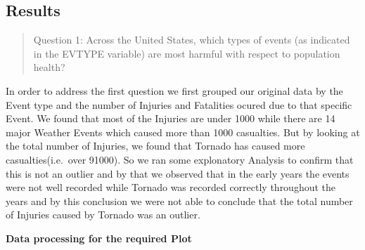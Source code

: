\documentclass[
]{article}
\newenvironment{Shaded}{\begin{snugshade}}{\end{snugshade}}
\newcommand{\CommentTok}[1]{\textcolor[rgb]{0.56,0.35,0.01}{\textit{#1}}}
\newcommand{\DataTypeTok}[1]{\textcolor[rgb]{0.13,0.29,0.53}{#1}}
\newcommand{\DecValTok}[1]{\textcolor[rgb]{0.00,0.00,0.81}{#1}}
\newcommand{\KeywordTok}[1]{\textcolor[rgb]{0.13,0.29,0.53}{\textbf{#1}}}
\newcommand{\NormalTok}[1]{#1}
\newcommand{\OperatorTok}[1]{\textcolor[rgb]{0.81,0.36,0.00}{\textbf{#1}}}
\newcommand{\StringTok}[1]{\textcolor[rgb]{0.31,0.60,0.02}{#1}}
\begin{document}
\hypertarget{results}{%
\subsection{Results}\label{results}}

\begin{quote}
Question 1: Across the United States, which types of events (as
indicated in the EVTYPE variable) are most harmful with respect to
population health?
\end{quote}

In order to address the first question we first grouped our original
data by the Event type and the number of Injuries and Fatalities ocured
due to that specific Event. We found that most of the Injuries are under
1000 while there are 14 major Weather Events which caused more than 1000
casualties. But by looking at the total number of Injuries, we found
that Tornado has caused more casualties(i.e.~over 91000). So we ran some
explonatory Analysis to confirm that this is not an outlier and by that
we observed that in the early years the events were not well recorded
while Tornado was recorded correctly throughout the years and by this
conclusion we were not able to conclude that the total number of
Injuries caused by Tornado was an outlier.

\textbf{Data processing for the required Plot}

\begin{Shaded}
\end{Shaded}
\end{document}
